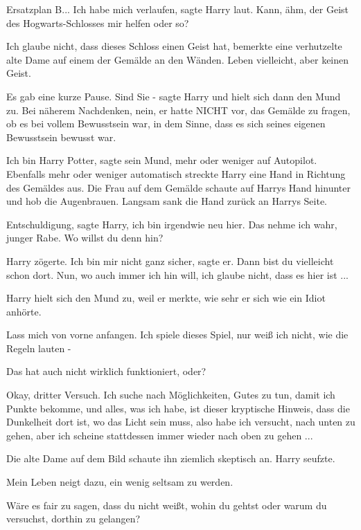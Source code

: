 Ersatzplan B... \glqq Ich habe mich verlaufen\grqq{}, sagte Harry laut. \glqq
Kann, ähm, der Geist des Hogwarts-Schlosses mir helfen oder so?\grqq{}

\glqq Ich glaube nicht, dass dieses Schloss einen Geist hat\grqq{}, bemerkte
eine verhutzelte alte Dame auf einem der Gemälde an den Wänden. \glqq Leben
vielleicht, aber keinen Geist.\grqq{}

Es gab eine kurze Pause. \glqq Sind Sie -\grqq{} sagte Harry und hielt sich dann
den Mund zu. Bei näherem Nachdenken, nein, er hatte NICHT vor, das Gemälde zu
fragen, ob es bei vollem Bewusstsein war, in dem Sinne, dass es sich seines
eigenen Bewusstsein bewusst war.

\glqq Ich bin Harry Potter\grqq{}, sagte sein Mund, mehr oder weniger auf
Autopilot. Ebenfalls mehr oder weniger automatisch streckte Harry eine Hand in
Richtung des Gemäldes aus. Die Frau auf dem Gemälde schaute auf Harrys Hand
hinunter und hob die Augenbrauen. Langsam sank die Hand zurück an Harrys Seite.

\glqq Entschuldigung\grqq{}, sagte Harry, \glqq ich bin irgendwie neu
hier.\grqq{} \glqq Das nehme ich wahr, junger Rabe. Wo willst du denn
hin?\grqq{}

Harry zögerte. \glqq Ich bin mir nicht ganz sicher\grqq{}, sagte er. \glqq Dann
bist du vielleicht schon dort.\grqq{} \glqq Nun, wo auch immer ich hin will, ich
glaube nicht, dass es hier ist ...\grqq{}

Harry hielt sich den Mund zu, weil er merkte, wie sehr er sich wie ein Idiot
anhörte.

\glqq Lass mich von vorne anfangen. Ich spiele dieses Spiel, nur weiß ich nicht,
wie die Regeln lauten -\grqq{}

Das hat auch nicht wirklich funktioniert, oder?

\glqq Okay, dritter Versuch. Ich suche nach Möglichkeiten, Gutes zu tun, damit
ich Punkte bekomme, und alles, was ich habe, ist dieser kryptische Hinweis, dass
die Dunkelheit dort ist, wo das Licht sein muss, also habe ich versucht, nach
unten zu gehen, aber ich scheine stattdessen immer wieder nach oben zu gehen
...\grqq{}

Die alte Dame auf dem Bild schaute ihn ziemlich skeptisch an. Harry seufzte.

\glqq Mein Leben neigt dazu, ein wenig seltsam zu werden.\grqq{}

\glqq Wäre es fair zu sagen, dass du nicht weißt, wohin du gehtst oder warum du
versuchst, dorthin zu gelangen?\grqq{}

